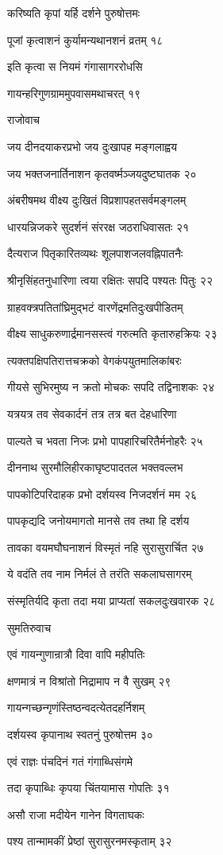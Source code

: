 करिष्यति कृपां यर्हि दर्शने पुरुषोत्तमः

पूजां कृत्वाशनं कुर्यामन्यथानशनं व्रतम् १८

इति कृत्वा स नियमं गंगासागररोधसि

गायन्हरिगुणग्राममुपवासमथाचरत् १९

राजोवाच

जय दीनदयाकरप्रभो जय दुःखापह मङ्गलाह्वय

जय भक्तजनार्तिनाशन कृतवर्ष्मञ्जयदुष्टघातक २०

अंबरीषमथ वीक्ष्य दुःखितं विप्रशापहतसर्वमङ्गलम्

धारयन्निजकरे सुदर्शनं संररक्ष जठराधिवासतः २१

दैत्यराज पितृकारितव्यथः शूलपाशजलवह्निपातनैः

श्रीनृसिंहतनुधारिणा त्वया रक्षितः सपदि पश्यतः पितुः २२

ग्राहवक्त्रपतितांघ्रिमुद्भटं वारणेंद्रमतिदुःखपीडितम्

वीक्ष्य साधुकरुणार्द्रमानसस्त्वं गरुत्मति कृतारुहक्रियः २३

त्यक्तपक्षिपतिरात्तचक्रको वेगकंपयुतमालिकांबरः

गीयसे सुभिरमुष्य न क्रतो मोचकः सपदि तद्विनाशकः २४

यत्रयत्र तव सेवकार्दनं तत्र तत्र बत देहधारिणा

पाल्यते च भवता निजः प्रभो पापहारिचरितैर्मनोहरैः २५

दीननाथ सुरमौलिहीरकाघृष्टपादतल भक्तवल्लभ

पापकोटिपरिदाहक प्रभो दर्शयस्व निजदर्शनं मम २६

पापकृद्यदि जनोयमागतो मानसे तव तथा हि दर्शय

तावका वयमघौघनाशनं विस्मृतं नहि सुरासुरार्चित २७

ये वदंति तव नाम निर्मलं ते तरंति सकलाघसागरम्

संस्मृतिर्यदि कृता तदा मया प्राप्यतां सकलदुःखवारक २८

सुमतिरुवाच

एवं गायन्गुणान्रात्रौ दिवा वापि महीपतिः

क्षणमात्रं न विश्रांतो निद्रामाप न वै सुखम् २९

गायन्गच्छन्गृणंस्तिष्ठन्वदत्येतदहर्निशम्

दर्शयस्व कृपानाथ स्वतनुं पुरुषोत्तम ३०

एवं राज्ञः पंचदिनं गतं गंगाब्धिसंगमे

तदा कृपाब्धिः कृपया चिंतयामास गोपतिः ३१

असौ राजा मदीयेन गानेन विगताघकः

पश्य तान्मामकीं प्रेष्ठां सुरासुरनमस्कृताम् ३२

